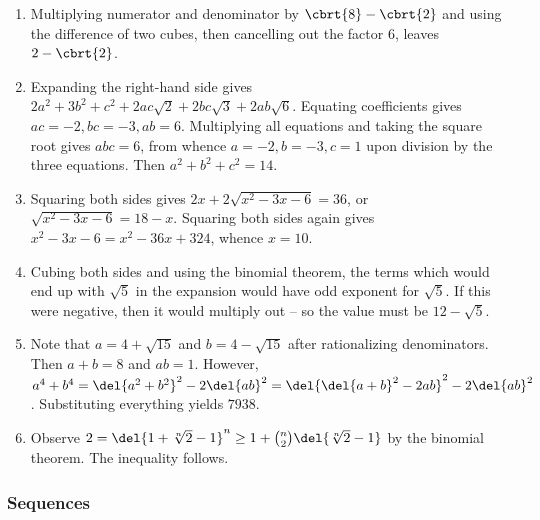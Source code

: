\documentclass[10pt,paper=letter]{scrartcl}
\begin{document}
\begin{enumerate}

\item Multiplying numerator and denominator by $\cbrt{8} - \cbrt{2}$ and using the difference of two cubes, then cancelling out the factor $6$, leaves $2 - \cbrt{2}$.

\item Expanding the right-hand side gives $2a^2 + 3b^2 + c^2 + 2ac\sqrt{2} + 2bc\sqrt{3} + 2ab\sqrt{6}$. Equating coefficients gives $ac = -2, bc = -3, ab = 6$. Multiplying all equations and taking the square root gives $abc = 6$, from whence $a = -2, b = -3, c = 1$ upon division by the three equations. Then $a^2 + b^2 + c^2 = 14$.

\item Squaring both sides gives $2x + 2\sqrt{x^2 - 3x - 6} = 36$, or $\sqrt{x^2 - 3x - 6} = 18 - x$. Squaring both sides again gives $x^2 - 3x - 6 = x^2 - 36x + 324$, whence $x = 10$.

\item Cubing both sides and using the binomial theorem, the terms which would end up with $\sqrt5$ in the expansion would have odd exponent for $\sqrt5$. If this were negative, then it would multiply out -- so the value must be $12 - \sqrt5$.

\item Note that $a = 4 + \sqrt{15}$ and $b = 4 - \sqrt{15}$ after rationalizing denominators. Then $a + b = 8$ and $ab = 1$. However, $a^4 + b^4 = \del{a^2 + b^2}^2 - 2\del{ab}^2 = \del{\del{a + b}^2 - 2ab}^2 - 2\del{ab}^2$. Substituting everything yields $7938$.

\item Observe $2 = \del{1 + \sqrt[n]2 - 1}^n \geq 1 + \binom{n}{2}\del{\sqrt[n]2 - 1}$ by the binomial theorem. The inequality follows.

\end{enumerate}

\subsubsection*{Sequences}
\end{document}
